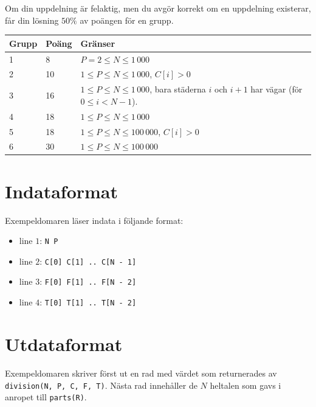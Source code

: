 Om din uppdelning är felaktig, men du avgör korrekt om en uppdelning existerar, får din lösning $50\%$ av poängen för en grupp.

\begin{tabular}{|l|l|l|}
  \hline
  \textbf{Grupp} & \textbf{Poäng} & \textbf{Gränser} \\ \hline
  1 & 8 & $P = 2 \le N \le 1\,000$ \\ \hline
  2 & 10 & $1 \le P \le N \le 1\,000$, $C[i] > 0$ \\ \hline
  3 & 16 & $1 \le P \le N \le 1\,000$, bara städerna $i$ och $i + 1$ har vägar (för $0 \le i < N - 1$). \\ \hline
  4 & 18 & $1 \le P \le N \le 1\,000$ \\ \hline
  5 & 18 & $1 \le P \le N \le 100\,000$, $C[i] > 0$ \\ \hline
  6 & 30 & $1 \le P \le N \le 100\,000$ \\ \hline
\end{tabular}

\section*{Indataformat}
Exempeldomaren läser indata i följande format:

\begin{itemize}
  \item line $1$: \texttt{N P}
  \item line $2$: \texttt{C[0] C[1] .. C[N - 1]}
  \item line $3$: \texttt{F[0] F[1] .. F[N - 2]}
  \item line $4$: \texttt{T[0] T[1] .. T[N - 2]}
\end{itemize}

\section*{Utdataformat}
Exempeldomaren skriver först ut en rad med värdet som returnerades av \texttt{division(N, P, C, F, T)}.
Nästa rad innehåller de $N$ heltalen som gavs i anropet till \texttt{parts(R)}.


